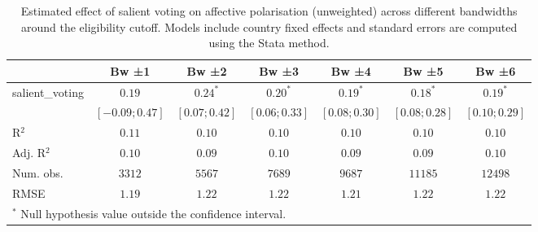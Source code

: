 
\begin{table}
\begin{center}
\begin{tabular}{l c c c c c c}
\hline
 & Bw ±1 & Bw ±2 & Bw ±3 & Bw ±4 & Bw ±5 & Bw ±6 \\
\hline
salient\_voting & $0.19$           & $0.24^{*}$      & $0.20^{*}$      & $0.19^{*}$      & $0.18^{*}$      & $0.19^{*}$      \\
                & $ [-0.09; 0.47]$ & $ [0.07; 0.42]$ & $ [0.06; 0.33]$ & $ [0.08; 0.30]$ & $ [0.08; 0.28]$ & $ [0.10; 0.29]$ \\
\hline
R$^2$           & $0.11$           & $0.10$          & $0.10$          & $0.10$          & $0.10$          & $0.10$          \\
Adj. R$^2$      & $0.10$           & $0.09$          & $0.10$          & $0.09$          & $0.09$          & $0.10$          \\
Num. obs.       & $3312$           & $5567$          & $7689$          & $9687$          & $11185$         & $12498$         \\
RMSE            & $1.19$           & $1.22$          & $1.22$          & $1.21$          & $1.22$          & $1.22$          \\
\hline
\multicolumn{7}{l}{\scriptsize{$^*$ Null hypothesis value outside the confidence interval.}}
\end{tabular}
\caption{Estimated effect of salient voting on affective polarisation (unweighted) across different bandwidths around the eligibility cutoff. Models include country fixed effects and standard errors are computed using the Stata method.}
\label{table:coefficients}
\end{center}
\end{table}
